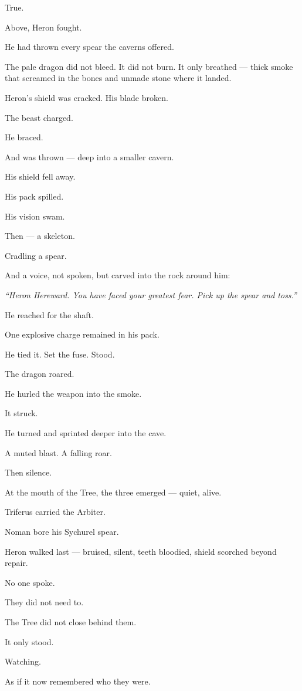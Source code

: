 \documentclass[9pt]{article}
\begin{document}
True.

\bigskip

Above, Heron fought.

He had thrown every spear the caverns offered.

The pale dragon did not bleed. It did not burn. It only breathed — thick smoke that screamed in the bones and unmade stone where it landed.

Heron’s shield was cracked. His blade broken.

The beast charged.

He braced.

And was thrown — deep into a smaller cavern.

His shield fell away.

His pack spilled.

His vision swam.

Then — a skeleton.

Cradling a spear.

And a voice, not spoken, but carved into the rock around him:

\textit{“Heron Hereward. You have faced your greatest fear. Pick up the spear and toss.”}

He reached for the shaft.

One explosive charge remained in his pack.

He tied it. Set the fuse. Stood.

The dragon roared.

He hurled the weapon into the smoke.

It struck.

He turned and sprinted deeper into the cave.

A muted blast. A falling roar.

Then silence.

\bigskip

At the mouth of the Tree, the three emerged — quiet, alive.

Triferus carried the Arbiter.

Noman bore his Sychurel spear.

Heron walked last — bruised, silent, teeth bloodied, shield scorched beyond repair.

No one spoke.

They did not need to.

The Tree did not close behind them.

It only stood.

Watching.

As if it now remembered who they were.
\end{document}
